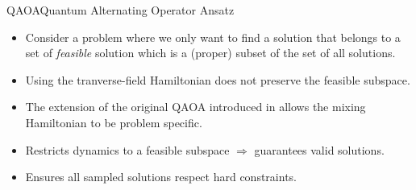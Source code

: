\begin{frame}{QAOA}{Quantum Alternating Operator Ansatz}
    \begin{itemize}
        \item Consider a problem where we only want to find a solution that belongs to a set of \textit{feasible} solution which is a (proper) subset of the set of all solutions.
        \item Using the tranverse-field Hamiltonian does not preserve the feasible subspace.
        \item The extension of the original QAOA introduced in \cite{Hadfield_2019-Quantum-Alternating-Operator-Ansatz-new-QAOA} allows the mixing Hamiltonian to be problem specific.
    \item Restricts dynamics to a feasible subspace $\Rightarrow$ guarantees valid solutions.
    \item Ensures all sampled solutions respect hard constraints.
    \end{itemize} 
\end{frame}
